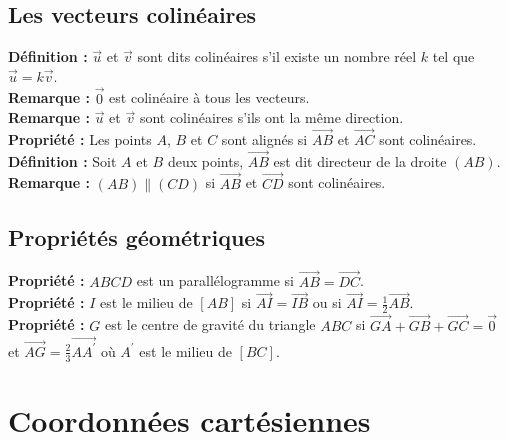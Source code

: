 \documentclass[a4paper,titlepage]{article}
\let\oldsection\section
\renewcommand\section{\clearpage\oldsection}
\begin{document}
    \subsection{Les vecteurs colinéaires}
        \textbf{Définition :} $\vec{u}$ et $\vec{v}$ sont dits colinéaires s’il existe un nombre réel $k$ tel que $\vec{u}=k\vec{v}$.
        \\
        \textbf{Remarque :} $\overrightarrow{0}$ est colinéaire à tous les vecteurs.
        \\
        \textbf{Remarque :} $\vec{u}$ et $\vec{v}$ sont colinéaires s’ils ont la même direction.
        \\
        \textbf{Propriété :} Les points $A$, $B$ et $C$ sont alignés si $\overrightarrow{AB}$ et $\overrightarrow{AC}$ sont colinéaires.
        \\
        \textbf{Définition :} Soit $A$ et $B$ deux points, $\overrightarrow{AB}$ est dit directeur de la droite $\left(AB\right)$.
        \\
        \textbf{Remarque :} $\left(AB\right)\parallel\left(CD\right)$ si $\overrightarrow{AB}$ et $\overrightarrow{CD}$ sont colinéaires.
    \subsection{Propriétés géométriques}
        \textbf{Propriété :} $ABCD$ est un parallélogramme si $\overrightarrow{AB}=\overrightarrow{DC}$.
        \\
        \textbf{Propriété :} $I$ est le milieu de $\left[AB\right]$ si $\overrightarrow{AI}=\overrightarrow{IB}$ ou si $\overrightarrow{AI}=\frac{1}{2}\overrightarrow{AB}$.
        \\
        \textbf{Propriété :} $G$ est le centre de gravité du triangle $ABC$ si $\overrightarrow{GA}+\overrightarrow{GB}+\overrightarrow{GC}=\overrightarrow{0}$ et $\overrightarrow{AG}=\frac{2}{3}\overrightarrow{AA^{\prime}}$ où $A^{\prime}$ est le milieu de $\left[BC\right]$.
\section{Coordonnées cartésiennes}
\end{document}
